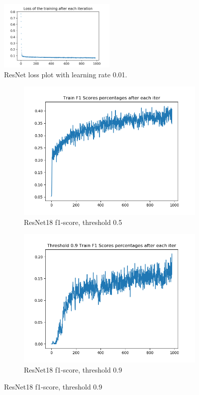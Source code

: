 \documentclass[12pt]{article}
\begin{document}
\begin{figure}[!ht]
\centering
\includegraphics[width=0.5\textwidth]{resnet18-lazy-1_0-train-loss.png}
\caption{\label{resnet18:resnet18-lazy-1_0-train-loss}ResNet loss plot with learning rate 0.01.}
\end{figure}

\begin{figure}[!ht]
\centering
\begin{subfigure}{.5\textwidth}
	\centering
	\includegraphics[width=1\linewidth]{resnet18-lazy-1_0-train-scores-f1.png}
	\caption{\label{resnet18:resnet18-lazy-1.0-train-scores-f1}ResNet18 f1-score, threshold 0.5}
\end{subfigure}%
\begin{subfigure}{.5\textwidth}
	\centering
	\includegraphics[width=1\linewidth]{resnet18-lazy-1_0-train-scores-f1-9.png}
	\caption{\label{resnet18:resnet18-lazy-1.0-train-scores-f1-9}ResNet18 f1-score, threshold 0.9}
\end{subfigure}
\end{figure}
\end{document}
